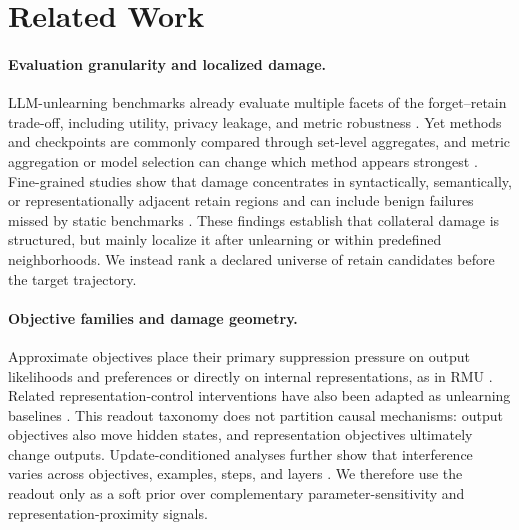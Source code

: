 \section{Related Work}
\label{sec:related}

\paragraph{Evaluation granularity and localized damage.}
LLM-unlearning benchmarks already evaluate multiple facets of the
forget--retain trade-off, including utility, privacy leakage, and metric
robustness
\cite{maini2024tofu,shi2024muse,dorna2025openunlearning}. Yet methods and
checkpoints are commonly compared through set-level aggregates, and metric
aggregation or model selection can change which method appears strongest
\cite{thaker2024position,dorna2025openunlearning}. Fine-grained studies show
that damage concentrates in syntactically, semantically, or
representationally adjacent retain regions and can include benign failures
missed by static benchmarks
\cite{chang2025retain,cheng2026entanglement,ko2025holes}. These findings
establish that collateral damage is structured, but mainly localize it after
unlearning or within predefined neighborhoods. We instead rank a declared
universe of retain candidates before the target trajectory.

\paragraph{Objective families and damage geometry.}
Approximate objectives place their primary suppression pressure on output
likelihoods and preferences
\cite{jang2023knowledge,yao2024large,zhang2024negative,
fan2024simplicity} or directly on internal representations, as in RMU
\cite{li2024wmdp}. Related representation-control interventions have also
been adapted as unlearning baselines
\cite{rosati2024repnoise,zou2024circuit}. This readout taxonomy
does not partition causal mechanisms: output objectives also move hidden
states, and representation objectives ultimately change outputs.
Update-conditioned analyses further show that interference varies across
objectives, examples, steps, and layers \cite{wang2025gradient}. We therefore
use the readout only as a soft prior over complementary parameter-sensitivity
and representation-proximity signals.

